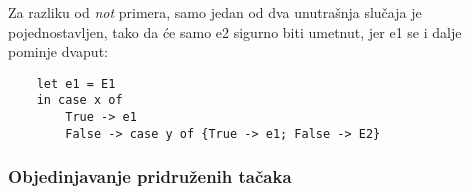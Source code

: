 Za razliku od \textit{not} primera, samo jedan od dva unutrašnja slučaja je pojednostavljen, tako da će samo e2 sigurno biti umetnut, jer e1 se i dalje pominje dvaput:
\begin{verbatim}
	let e1 = E1
	in case x of
		True -> e1
		False -> case y of {True -> e1; False -> E2}
\end{verbatim}

%
%
%
%

\subsubsection{Objedinjavanje pridruženih tačaka}
\label{sec:podpodnaslovGeneralization}

